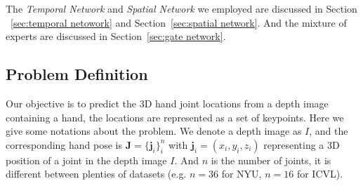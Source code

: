 \documentclass[journal,comsoc]{IEEEtran}
\newcommand{\J}{\textbf{J}}
\begin{document}
The \emph{Temporal Network} and \emph{Spatial Network} we employed are discussed in Section
~\ref{sec:temporal netowork} and Section~\ref{sec:spatial network}. And the mixture of experts
are discussed in Section~\ref{sec:gate network}.

\subsection{Problem Definition}\label{sec:problem definition}
Our objective is to predict the 3D hand joint locations from a depth image containing a hand,
the locations are represented as a set of keypoints. Here we give some notations about the
problem. We denote a depth image as $I$, and the corresponding hand pose is
$\J=\{\textbf{j}_i\}_i^n$ with $\textbf{j}_i=(x_i,y_i,z_i)$ representing a 3D position of a
joint in the depth image $I$. And $n$ is the number of joints, it is different between plenties
of datasets (e.g. $n=36$ for NYU, $n=16$ for ICVL).
\end{document}
